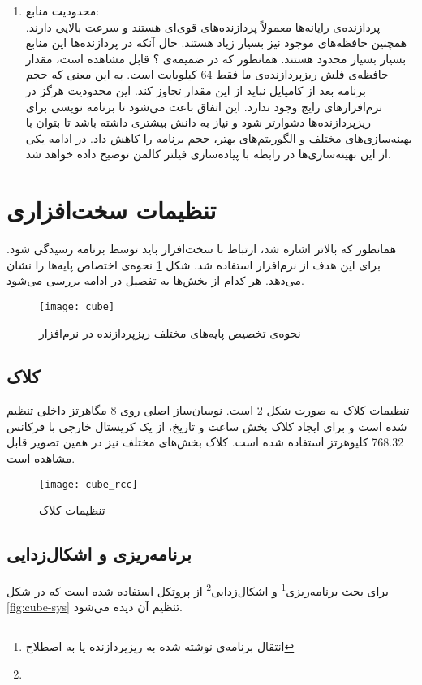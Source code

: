 \begin{enumerate}
	\item محدودیت منابع: \\
	پردازنده‌ی رایانه‌ها معمولاً پردازنده‌های قوی‌ای هستند و سرعت بالایی دارند. همچنین حافظه‌های موجود نیز بسیار زیاد هستند. حال آنکه در پردازنده‌ها این منابع بسیار بسیار محدود هستند. همانطور که در ضمیمه‌ی ؟ قابل مشاهده است، مقدار حافظه‌ی فلش ریزپردازنده‌ی ما فقط 64 کیلوبایت است. به این معنی که حجم برنامه بعد از کامپایل نباید از این مقدار تجاوز کند. این محدودیت هرگز در نرم‌افزارهای رایج وجود ندارد. این اتفاق باعث می‌شود تا برنامه نویسی برای ریزپردازنده‌ها دشوارتر شود و نیاز به دانش بیشتری داشته باشد تا بتوان با بهینه‌سازی‌های مختلف و الگوریتم‌های بهتر، حجم برنامه را کاهش داد. در ادامه یکی از این بهینه‌سازی‌ها در رابطه با پیاده‌سازی فیلتر کالمن توضیح داده خواهد شد.
\end{enumerate}

\section{تنظیمات سخت‌افزاری}
همانطور که بالاتر اشاره شد، ارتباط با سخت‌افزار باید توسط برنامه رسیدگی شود. برای این هدف از نرم‌افزار  استفاده شد. شکل \ref{fig:cube-main} نحوه‌ی اختصاص پایه‌ها را نشان می‌دهد. هر کدام از بخش‌ها به تفصیل در ادامه بررسی می‌شود.

	\begin{figure}[h]
		\centering
		\texttt{[image: cube]}
		\caption{نحوه‌ی تخصیص پایه‌های مختلف ریزپردازنده در نرم‌افزار }
		\label{fig:cube-main}
	\end{figure}

\subsection{کلاک}
تنظیمات کلاک به صورت شکل \ref{fig:cube-rcc} است. نوسان‌ساز اصلی روی 8 مگاهرتز داخلی تنظیم شده است و برای ایجاد کلاک بخش ساعت و تاریخ، از یک کریستال خارجی با فرکانس 768.32 کلیوهرتز استفاده شده است. کلاک بخش‌های مختلف نیز در همین تصویر قابل مشاهده است.

	\begin{figure}[h]
		\centering
		\texttt{[image: cube\_rcc]}
		\caption{تنظیمات کلاک}
		\label{fig:cube-rcc}
	\end{figure}

\subsection{برنامه‌ریزی و اشکال‌زدایی}
برای بحث برنامه‌ریزی\footnote{انتقال برنامه‌ی نوشته شده به ریزپردازنده یا به اصطلاح } و اشکال‌زدایی\footnote{} از پروتکل  استفاده شده است که در شکل \ref{fig:cube-sys} تنظیم آن دیده می‌شود.

